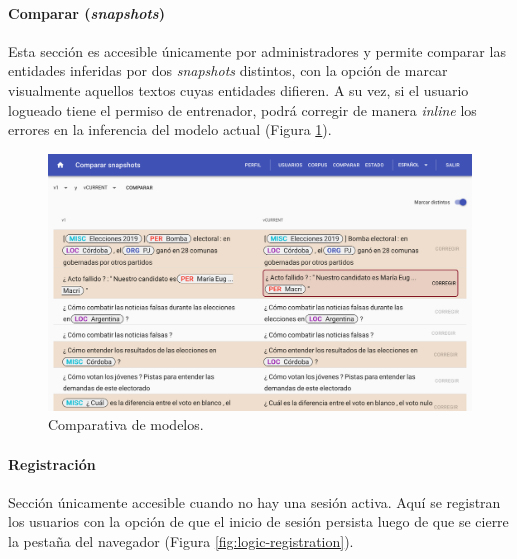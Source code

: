\documentclass[12pt,a4paper,]{scrartcl}
\let\oldparagraph\paragraph
\renewcommand{\paragraph}[1]{\oldparagraph{#1}\mbox{}}
\begin{document}
\hypertarget{comparar-snapshots}{%
\paragraph{\texorpdfstring{Comparar (\emph{snapshots})}{Comparar (snapshots)}}\label{comparar-snapshots}}

Esta sección es accesible únicamente por administradores y permite comparar las entidades inferidas por dos \emph{snapshots} distintos, con la opción de marcar visualmente aquellos textos cuyas entidades difieren. A su vez, si el usuario logueado tiene el permiso de entrenador, podrá corregir de manera \emph{inline} los errores en la inferencia del modelo actual (Figura \ref{fig:logic-compare}).

\begin{figure}[H]

{\centering \includegraphics{assets/logic/compare.pdf} 

}

\caption{Comparativa de modelos.}\label{fig:logic-compare}
\end{figure}

\hypertarget{registraciuxf3n}{%
\paragraph{Registración}\label{registraciuxf3n}}

Sección únicamente accesible cuando no hay una sesión activa. Aquí se registran los usuarios con la opción de que el inicio de sesión persista luego de que se cierre la pestaña del navegador (Figura \ref{fig:logic-registration}).
\end{document}

